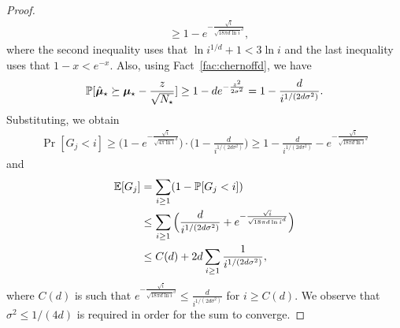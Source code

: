 \begin{proof}
\begin{align*}
        & \geq 1 - e^{-\frac{\sqrt{i}}{\sqrt{18 \pi d \ln i}^d}},
    \end{align*}
    where the second inequality uses that $\ln i^{1/d} + 1 < 3 \ln i$ and the last inequality uses that $1 - x < e^{-x}$. Also, using Fact~\ref{fac:chernoffd}, we have
    \begin{align*}
        \mathbb{P}[\hat {\boldsymbol{\mu}}_\star \succeq \boldsymbol{\mu}_\star - \frac{z}{\sqrt{N_\star}}]
        \geq 1 - d e^{-\frac{z^2}{2\sigma^2}}
        = 1 - \frac{d}{i^{1/(2d\sigma^2)}}.
    \end{align*}
    Substituting, we obtain
    \begin{align*}
        \Pr[G_j < i]
        \geq \Big( 1 - e^{-\frac{\sqrt{i}}{\sqrt{4 \pi \ln i}^d}} \Big) \cdot \Big( 1 - \frac{d}{i^{1/(2d\sigma^2)}} \Big)
        \geq 1 - \frac{d}{i^{1/(2d\sigma^2)}} - e^{-\frac{\sqrt{i}}{\sqrt{18 \pi d \ln i}^d}}
    \end{align*}
    and
    \begin{align*}
        \mathbb{E}[G_j]
        & = \sum_{i \geq 1} (1 - \mathbb{P}[G_j < i]) \\
        & \leq \sum_{i \geq 1} \Big( \frac{d}{i^{1/(2d\sigma^2)}} + e^{-\frac{\sqrt{i}}{\sqrt{18 \pi d \ln i}^d}} \Big) \\
        & \leq C(d) + 2 d \sum_{i \geq 1} \frac{1}{i^{1/(2d\sigma^2)}},
    \end{align*}
    where $C(d)$ is such that $e^{-\frac{\sqrt{i}}{\sqrt{18 \pi d \ln i}^d}} \leq \frac{d}{i^{1/(2d\sigma^2)}}$ for $i \geq C(d)$. We observe that $\sigma^2 \leq 1/(4d)$ is required in order for the sum to converge.
\end{proof}

